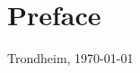 \section*{Preface}

\begin{comment}
The Preface includes the facts: what type of project, where it is conducted,
who supervised, and any acknowledgements you wish to give.

This Master's Thesis template was created by Bj\"orn Gamb\"ack and is based on a template that he created for the 2016 ``Experts in Team'' course on
Computational Creativity (TDT4853) at the Norwegian University of Science and Technology (NTNU),
which in turn was heavily based on the 2014 AI Master's Thesis template created by Anders Kofod-Petersen ---
with some of the explaining text stemming from Anders' original template.

You may basically thank anybody you like (and avoid thanking anybody you do not like) and in any form you like.
However, it is a good idea to always thank people who made direct contributions, e.g., those whose data you have been given access to or those whose images you have been given permission to reproduce.

Some students choose to include the text of the original project description in the Preface. This is possible but not necessary,
in particular not if you have changed the theme somewhat over time.
The Preface of the Master's Thesis might also be a good place to introduce your Specialisation Project, in case you plan
on reusing some texts from it (since the Specialisation Project is not a published and easily accessible work, and might
not be known to your audience, neither your text in itself nor even the general concept as such).
\end{comment}

\vfill

\hfill \thesisAuthor

\hfill Trondheim, \today
